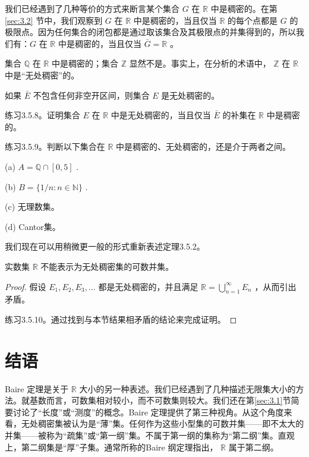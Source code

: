 我们已经遇到了几种等价的方式来断言某个集合 \(G\) 在 \(\mathbb{R}\) 中是稠密的。在第 \ref{sec:3.2} 节中，我们观察到 \(G\) 在 \(\mathbb{R}\) 中是稠密的，当且仅当 \(\mathbb{R}\) 的每个点都是 \(G\) 的极限点。因为任何集合的闭包都是通过取该集合及其极限点的并集得到的，所以我们有：\(G\) 在 \(\mathbb{R}\) 中是稠密的，当且仅当 \(\bar{G} = \mathbb{R}\) 。

集合 \(\mathbb{Q}\) 在 \(\mathbb{R}\) 中是稠密的；集合 \(\mathbb{Z}\) 显然不是。事实上，在分析的术语中， \(\mathbb{Z}\) 在 \(\mathbb{R}\) 中是“无处稠密”的。

\begin{Def}
  \label{def:3.5.3}
  如果 \(\bar{E}\) 不包含任何非空开区间，则集合 \(E\) 是无处稠密的。
\end{Def}

练习3.5.8。证明集合 \(E\) 在 \(\mathbb{R}\) 中是无处稠密的，当且仅当 \(\bar{E}\) 的补集在 \(\mathbb{R}\) 中是稠密的。

练习3.5.9。判断以下集合在 \(\mathbb{R}\) 中是稠密的、无处稠密的，还是介于两者之间。

(a) \(A = \mathbb{Q} \cap  \left\lbrack  {0,5}\right\rbrack\) .

(b) \(B = \{ 1/n : n \in  \mathbb{N}\}\) .

(c) 无理数集。

(d) Cantor集。

我们现在可以用稍微更一般的形式重新表述定理3.5.2。

\begin{Thm}[Baire]
  \label{thm:3.5.4}
  实数集 \(\mathbb{R}\) 不能表示为无处稠密集的可数并集。
\end{Thm}

\begin{proof}
  假设 \({E}_{1},{E}_{2},{E}_{3},\ldots\) 都是无处稠密的，并且满足 \(\mathbb{R} = \mathop{\bigcup }\limits_{{n = 1}}^{\infty }{E}_{n}\) ，从而引出矛盾。

  练习3.5.10。通过找到与本节结果相矛盾的结论来完成证明。
\end{proof}



\section{结语}
\label{sec:3.6}
Baire 定理是关于 \(\mathbb{R}\) 大小的另一种表述。我们已经遇到了几种描述无限集大小的方法。就基数而言，可数集相对较小，而不可数集则较大。我们还在第\ref{sec:3.1}节简要讨论了“长度”或“测度”的概念。Baire 定理提供了第三种视角。从这个角度来看，无处稠密集被认为是“薄”集。任何作为这些小型集的可数并集——即不太大的并集——被称为“疏集”或“第一纲”集。不属于第一纲的集称为“第二纲”集。直观上，第二纲集是“厚”子集。通常所称的Baire 纲定理指出， \(\mathbb{R}\) 属于第二纲。

